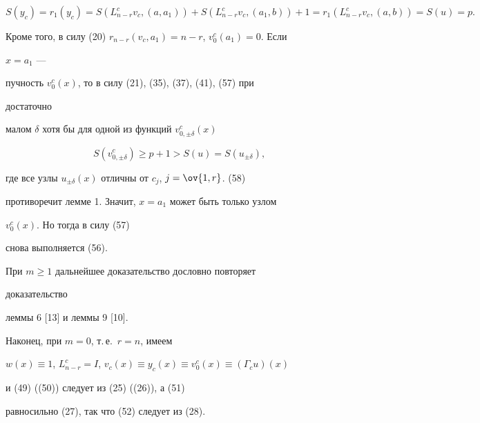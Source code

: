 \begin{pf}
\begin{equation} 


S(y_c)=r_1(y_c)=S(L^c_{n-r}v_c,(a,a_1))+ 


S(L^c_{n-r}v_c,(a_1,b))+1= 


r_1(L^c_{n-r}v_c,(a,b))=S(u)=p. 


\end{equation} 


Кроме того, в силу (20)\; $r_{n-r}(v_c,a_1)=n-r$, $v^c_0(a_1)=0$. Если 


$x=a_1$ --- 


пучность $v^c_0(x)$, то в силу (21), (35), (37), (41), (57) при 


достаточно 


малом $\delta$ хотя бы для одной из функций $v^c_{0,\pm\delta}(x)$ 


\begin{equation} 


S(v^c_{0,\pm\delta})\ge p+1>S(u)=S(u_{\pm\delta}), 


\end{equation} 


где все узлы $u_{\pm\delta}(x)$ отличны от $c_j$, $j=\ov{1,r}$.\; (58) 


противоречит лемме 1. Значит, $x=a_1$ может быть только узлом 


$v^c_0(x)$. Но тогда в силу (57) 


снова выполняется (56). 


 


При $m\ge 1$ дальнейшее доказательство дословно повторяет 


доказательство 


леммы 6 [13] и леммы 9 [10]. 


 


Наконец, при $m=0$, т.\,е.~$r=n$, имеем 


$w(x)\equiv1$, $L^c_{n-r}=I$, $v_c(x)\equiv y_c(x)\equiv v^c_0(x)\equiv 


(\Gamma_c u)(x)$ 


и (49) ((50)) следует из (25) ((26)), а (51) 


равносильно (27), так что (52) следует из (28). 


\end{pf} 


 


